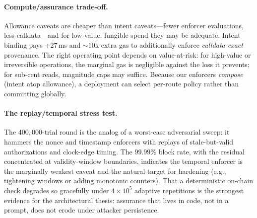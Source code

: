 \documentclass[10pt,twocolumn,letterpaper]{article}
\begin{document}
\paragraph{Compute/assurance trade-off.} Allowance caveats are cheaper than intent caveats---fewer enforcer evaluations, less calldata---and for low-value, fungible spend they may be adequate. Intent binding pays $+27$\,ms and $\sim$$10$k extra gas to additionally enforce \emph{calldata-exact} provenance. The right operating point depends on value-at-risk: for high-value or irreversible operations, the marginal gas is negligible against the loss it prevents; for sub-cent reads, magnitude caps may suffice. Because our enforcers \emph{compose} (intent atop allowance), a deployment can select per-route policy rather than committing globally.

\paragraph{The replay/temporal stress test.} The $400{,}000$-trial round is the analog of a worst-case adversarial sweep: it hammers the nonce and timestamp enforcers with replays of stale-but-valid authorizations and clock-edge timing. The $99.99\%$ block rate, with the residual concentrated at validity-window boundaries, indicates the temporal enforcer is the marginally weakest caveat and the natural target for hardening (e.g., tightening windows or adding monotonic counters). That a deterministic on-chain check degrades so gracefully under $4\times10^5$ adaptive repetitions is the strongest evidence for the architectural thesis: assurance that lives in code, not in a prompt, does not erode under attacker persistence.
\end{document}
